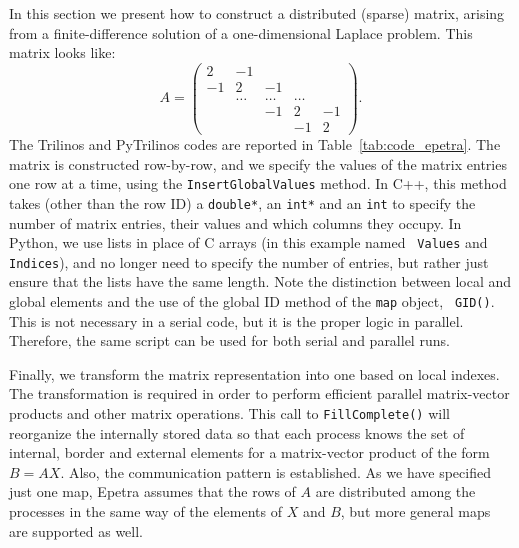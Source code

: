 \documentclass[acmtocl]{acmtrans2m}
\begin{document}
In this section we present how to construct a distributed (sparse)
matrix, arising from a finite-difference solution of a
one-dimensional Laplace problem. This matrix looks like:
\begin{equation*}
  A = \begin{pmatrix}
     2 & -1     &        &        &    \\
    -1 &  2     & -1     &        &    \\
       & \ldots & \ldots & \ldots &    \\
       &        & -1     & 2      & -1 \\
       &        &        & -1     & 2
  \end{pmatrix}.
\end{equation*}
The Trilinos and PyTrilinos codes are reported in
Table~\ref{tab:code_epetra}.  The matrix is constructed row-by-row,
and we specify the values of the matrix entries one row at a time,
using the {\tt InsertGlobalValues} method.  In C++, this method takes
(other than the row ID)
a {\tt double*}, an {\tt int*} and an {\tt int}  to specify the number
of matrix entries, their values and which columns they occupy.  In
Python, we use lists in place of C arrays (in this example named {\tt
  Values} and {\tt Indices}), and no longer need to specify the number
of entries, but rather just ensure that the lists have the same
length.  Note the distinction between local and global elements and
the use of the global ID method of the {\tt map} object, {\tt
GID()}. This is not necessary in a serial code, but it is the proper
logic in parallel. Therefore, the same script can be used for both
serial and parallel runs.

Finally, we transform the matrix representation into one based on
local indexes. The transformation is required in order to perform
efficient parallel matrix-vector products and other matrix
operations. This call to {\tt FillComplete()} will reorganize the
internally stored data so that each process knows the set of internal,
border and external elements for a matrix-vector product of the form
$B = AX$. Also, the communication pattern is established. As we have
specified just one map, Epetra assumes that the rows of $A$ are
distributed among the processes in the same way of the elements of $X$
and $B$, but more general maps are supported as well.
\end{document}

